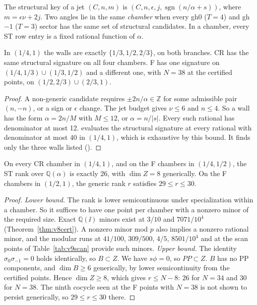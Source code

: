 The structural key of a jet \((C,n,m)\) is
\((C,n,\epsilon,j,\operatorname{sgn}(n/\alpha+s))\), where
\(m=\epsilon\nu+2j\). Two angles lie in the same \emph{chamber} when
every gh0 (\(T=4\)) and gh\(-1\) (\(T=3\)) sector has the same set
of structural candidates. In a chamber, every ST row entry is a
fixed rational function of \(\alpha\).

\begin{proposition}
\label{prop:v9walls}
In \((1/4,1)\) the walls are exactly \(\{1/3,1/2,2/3\}\), on both
branches. CR has the same structural signature on all four
chambers. F has one signature on \((1/4,1/3)\cup(1/3,1/2)\) and a
different one, with \(N=38\) at the certified points, on
\((1/2,2/3)\cup(2/3,1)\).
\end{proposition}

\begin{proof}
A non-generic candidate requires \(\pm2n/\alpha\in\mathbb Z\) for
some admissible pair \((n,-n)\), or a sign or \(\epsilon\) change.
The jet budget gives \(\nu\le6\) and \(n\le4\). So a wall has the
form \(\alpha=2n/M\) with \(M\le12\), or \(\alpha=n/|s|\). Every
such rational has denominator at most 12.
 evaluates the structural signature
at every rational with denominator at most 40 in \((1/4,1)\),
which is exhaustive by this bound. It finds only the three walls
listed ().
\end{proof}

\begin{theorem}
\label{thm:v9generic}
On every CR chamber in \((1/4,1)\), and on the F chambers in
\((1/4,1/2)\), the ST rank over \(\mathbb Q(\alpha)\) is exactly
\(26\), with \(\dim Z=8\) generically. On the F chambers in
\((1/2,1)\), the generic rank \(r\) satisfies \(29\le r\le30\).
\end{theorem}

\begin{proof}
\emph{Lower bound.} The rank is lower semicontinuous under
specialization within a chamber. So it suffices to have one point
per chamber with a nonzero minor of the required size. Exact
\(\mathbb Q(\ii)\) minors exist at \(3/10\) and \(7071/10^4\)
(Theorem~\ref{thm:v8cert}). A nonzero minor mod \(p\) also implies
a nonzero rational minor, and the modular runs at \(41/100\),
\(309/500\), \(4/5\), \(8501/10^4\) and at the scan points of
Table~\ref{tab:v9scan} provide such minors.
\emph{Upper bound.} The identity \(\sigma_0\sigma_{-1}=0\) holds
identically, so \(B\subset Z\). We have \(s\phi=0\), so \(PP\subset Z\).
\(B\) has no PP components, and \(\dim B\ge6\) generically, by lower
semicontinuity from the certified points. Hence \(\dim Z\ge8\),
which gives \(r\le N-8\): \(26\) for \(N=34\) and \(30\) for
\(N=38\). The ninth cocycle seen at the F points with \(N=38\) is
not shown to persist generically, so \(29\le r\le30\) there.
\end{proof}

